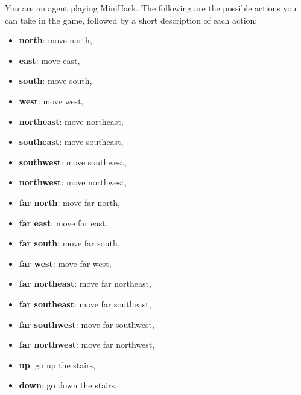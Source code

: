 \begin{MyGreenBox}
	[frametitle={\textbf{Iteration 1 MiniHack Prompt}}] You are an agent playing MiniHack.
	The following are the possible actions you can take in the game, followed by a
	short description of each action:

	\begin{itemize}
		\item \textbf{north}: move north,

		\item \textbf{east}: move east,

		\item \textbf{south}: move south,

		\item \textbf{west}: move west,

		\item \textbf{northeast}: move northeast,

		\item \textbf{southeast}: move southeast,

		\item \textbf{southwest}: move southwest,

		\item \textbf{northwest}: move northwest,

		\item \textbf{far north}: move far north,

		\item \textbf{far east}: move far east,

		\item \textbf{far south}: move far south,

		\item \textbf{far west}: move far west,

		\item \textbf{far northeast}: move far northeast,

		\item \textbf{far southeast}: move far southeast,

		\item \textbf{far southwest}: move far southwest,

		\item \textbf{far northwest}: move far northwest,

		\item \textbf{up}: go up the stairs,

		\item \textbf{down}: go down the stairs,


\end{itemize}
\end{MyGreenBox}
